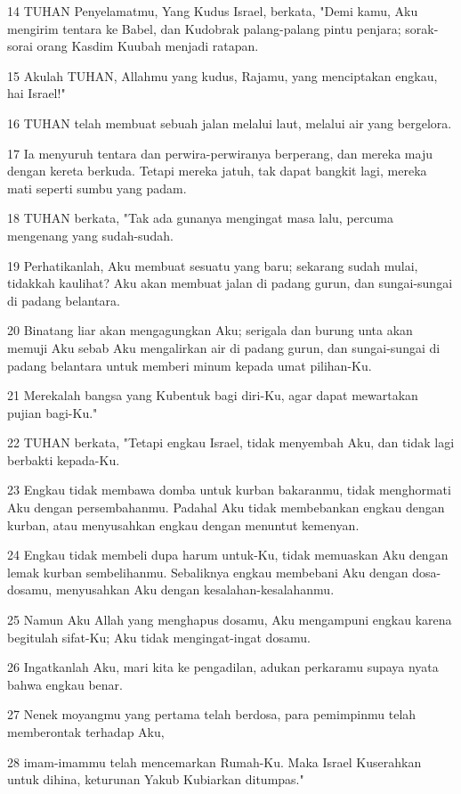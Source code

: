 \par 14 TUHAN Penyelamatmu, Yang Kudus Israel, berkata, "Demi kamu, Aku mengirim tentara ke Babel, dan Kudobrak palang-palang pintu penjara; sorak-sorai orang Kasdim Kuubah menjadi ratapan.
\par 15 Akulah TUHAN, Allahmu yang kudus, Rajamu, yang menciptakan engkau, hai Israel!"
\par 16 TUHAN telah membuat sebuah jalan melalui laut, melalui air yang bergelora.
\par 17 Ia menyuruh tentara dan perwira-perwiranya berperang, dan mereka maju dengan kereta berkuda. Tetapi mereka jatuh, tak dapat bangkit lagi, mereka mati seperti sumbu yang padam.
\par 18 TUHAN berkata, "Tak ada gunanya mengingat masa lalu, percuma mengenang yang sudah-sudah.
\par 19 Perhatikanlah, Aku membuat sesuatu yang baru; sekarang sudah mulai, tidakkah kaulihat? Aku akan membuat jalan di padang gurun, dan sungai-sungai di padang belantara.
\par 20 Binatang liar akan mengagungkan Aku; serigala dan burung unta akan memuji Aku sebab Aku mengalirkan air di padang gurun, dan sungai-sungai di padang belantara untuk memberi minum kepada umat pilihan-Ku.
\par 21 Merekalah bangsa yang Kubentuk bagi diri-Ku, agar dapat mewartakan pujian bagi-Ku."
\par 22 TUHAN berkata, "Tetapi engkau Israel, tidak menyembah Aku, dan tidak lagi berbakti kepada-Ku.
\par 23 Engkau tidak membawa domba untuk kurban bakaranmu, tidak menghormati Aku dengan persembahanmu. Padahal Aku tidak membebankan engkau dengan kurban, atau menyusahkan engkau dengan menuntut kemenyan.
\par 24 Engkau tidak membeli dupa harum untuk-Ku, tidak memuaskan Aku dengan lemak kurban sembelihanmu. Sebaliknya engkau membebani Aku dengan dosa-dosamu, menyusahkan Aku dengan kesalahan-kesalahanmu.
\par 25 Namun Aku Allah yang menghapus dosamu, Aku mengampuni engkau karena begitulah sifat-Ku; Aku tidak mengingat-ingat dosamu.
\par 26 Ingatkanlah Aku, mari kita ke pengadilan, adukan perkaramu supaya nyata bahwa engkau benar.
\par 27 Nenek moyangmu yang pertama telah berdosa, para pemimpinmu telah memberontak terhadap Aku,
\par 28 imam-imammu telah mencemarkan Rumah-Ku. Maka Israel Kuserahkan untuk dihina, keturunan Yakub Kubiarkan ditumpas."

